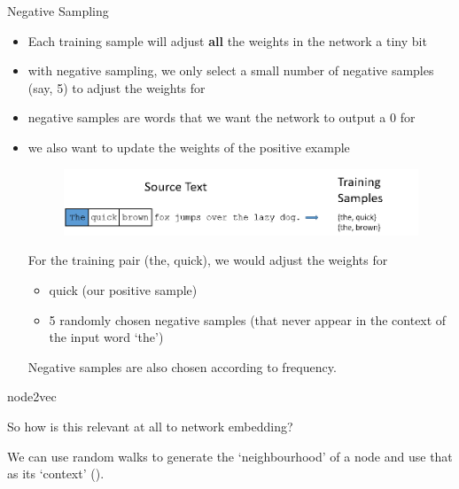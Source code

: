 \documentclass{beamer}
\begin{document}
	
	\begin{frame}[allowframebreaks]{Negative Sampling}
		
		\begin{itemize}
			\item Each training sample will adjust \textbf{all} the weights in the network a tiny bit
			\item with negative sampling, we only select a small number of negative samples (say, 5) to adjust the weights for
			\item negative samples are words that we want the network to output a 0 for
			\item we also want to update the weights of the positive example
			
			\pagebreak
			
			\begin{figure}
				\centering
				\includegraphics[width=\textwidth]{presentation_5_figures/training_data_cut}
			\end{figure}
			
			For the training pair (the, quick), we would adjust the weights for 
			\begin{itemize}
				\item quick (our positive sample)
				\item 5 randomly chosen negative samples (that never appear in the context of the input word `the')
			\end{itemize}

			Negative samples are also chosen according to frequency.
		\end{itemize}
		
		
	\end{frame}
	
	\begin{frame}[allowframebreaks]{node2vec}
		
		So how is this relevant at all to network embedding?
		
		\pagebreak
		
		We can use random walks to generate the `neighbourhood' of a node and use that as its `context' (\cite{grover2016node2vec}).
		
	\end{frame}
	
\end{document}

